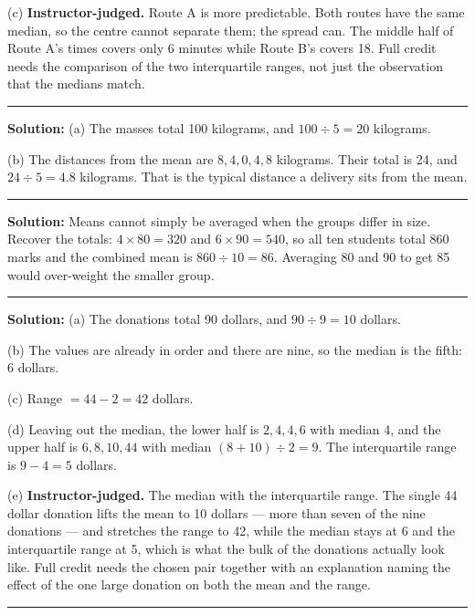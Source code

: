\documentclass[12pt]{article}
\begin{document}
(c) \textbf{Instructor-judged.} Route A is more predictable. Both routes have
the same median, so the centre cannot separate them; the spread can. The middle
half of Route A's times covers only 6 minutes while Route B's covers 18. Full
credit needs the comparison of the two interquartile ranges, not just the
observation that the medians match.

\vspace{0.22cm}\noindent\rule{\linewidth}{0.2pt}\vspace{0.22cm}


\textbf{Solution:} (a) The masses total 100 kilograms, and $100 \div 5 = 20$
kilograms. 

(b) The distances from the mean are $8, 4, 0, 4, 8$ kilograms. Their total is
24, and $24 \div 5 = 4.8$ kilograms. That is the typical distance a delivery
sits from the mean. 

\vspace{0.22cm}\noindent\rule{\linewidth}{0.2pt}\vspace{0.22cm}


\textbf{Solution:} Means cannot simply be averaged when the groups differ in
size. Recover the totals: $4 \times 80 = 320$ and $6 \times 90 = 540$, so all
ten students total $860$ marks and the combined mean is
$860 \div 10 = 86$. Averaging 80 and 90 to get 85 would over-weight the smaller
group. 

\vspace{0.22cm}\noindent\rule{\linewidth}{0.2pt}\vspace{0.22cm}


\textbf{Solution:} (a) The donations total 90 dollars, and $90 \div 9 = 10$
dollars. 

(b) The values are already in order and there are nine, so the median is the
fifth: 6 dollars. 

(c) Range $= 44 - 2 = 42$ dollars. 

(d) Leaving out the median, the lower half is $2, 4, 4, 6$ with median 4, and
the upper half is $6, 8, 10, 44$ with median $(8 + 10) \div 2 = 9$. The
interquartile range is $9 - 4 = 5$ dollars. 

(e) \textbf{Instructor-judged.} The median with the interquartile range. The
single 44 dollar donation lifts the mean to 10 dollars --- more than seven of
the nine donations --- and stretches the range to 42, while the median stays at
6 and the interquartile range at 5, which is what the bulk of the donations
actually look like. Full credit needs the chosen pair together with an
explanation naming the effect of the one large donation on both the mean and the
range.

\vspace{0.22cm}\noindent\rule{\linewidth}{0.2pt}\vspace{0.22cm}
\end{document}
